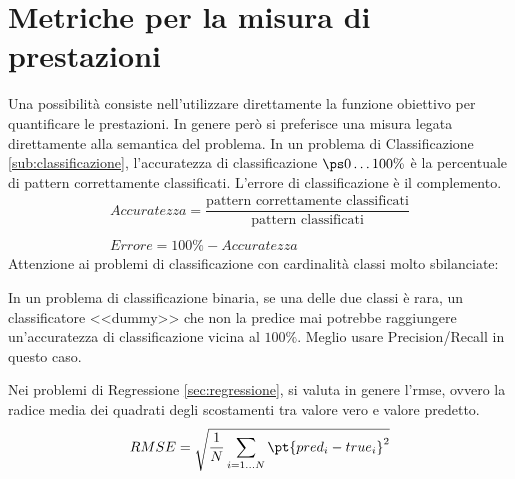 \section{Metriche per la misura di prestazioni}\label{sub:metriche_per_la_misura_di_prestazioni} %
Una possibilità consiste nell'utilizzare direttamente la funzione obiettivo per quantificare le prestazioni.
In genere però si preferisce una misura legata direttamente alla semantica del problema.
In un problema di Classificazione \cref{sub:classificazione}, l'accuratezza di classificazione $\ps{0\dots100\%}$ è la percentuale di pattern correttamente classificati.
L'errore di classificazione è il complemento.
\[
    \begin{matrix}
        Accuratezza = \dfrac{\text{pattern correttamente classificati}}{\text{pattern classificati}} \\ \\
        Errore = 100\% - Accuratezza
    \end{matrix}
\]
Attenzione ai problemi di classificazione con cardinalità classi molto sbilanciate:
\begin{example}{}{}
    In un problema di classificazione binaria, se una delle due classi è rara, un classificatore <<dummy>> che non la predice mai potrebbe raggiungere un'accuratezza di classificazione vicina al $100\%$.
    Meglio usare Precision/Recall in questo caso.
\end{example}
Nei problemi di Regressione \cref{sec:regressione}, si valuta in genere l'\ac{rmse}, ovvero la radice media dei quadrati degli scostamenti tra valore vero e valore predetto.
\[
    RMSE = \sqrt{\dfrac{1}{N}\sum_{i = 1\dots N}{\pt{pred_i - true_i}^2}}
\]
%
